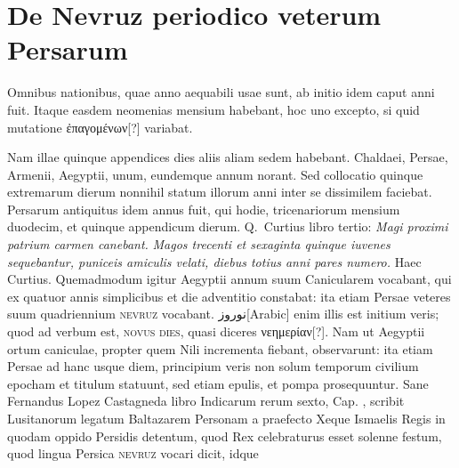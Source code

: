 \section{De Nevruz periodico veterum Persarum}
%
Omnibus nationibus, quae anno aequabili usae sunt, ab
initio idem caput anni fuit.
Itaque easdem neomenias mensium
habebant, hoc uno excepto, si quid mutatione \textgreek{ἐπαγομένων}[?]
variabat.
\begin{table}[htbp]
  
\end{table}
%
Nam illae quinque appendices dies aliis aliam sedem habebant.
Chaldaei, Persae, Armenii, Aegyptii, unum, eundemque annum
norant.
Sed collocatio quinque extremarum dierum nonnihil
statum illorum anni inter se dissimilem faciebat.
Persarum antiquitus
idem annus fuit, qui hodie, tricenariorum mensium duodecim, et
quinque appendicum dierum.
Q.~Curtius libro tertio: \textit{Magi proximi
patrium carmen canebant.}
\textit{Magos trecenti et sexaginta quinque
iuvenes sequebantur, puniceis amiculis velati, diebus totius anni pares
numero.}
Haec Curtius.
Quemadmodum igitur Aegyptii annum
suum Canicularem vocabant, qui ex quatuor annis simplicibus et
die adventitio constabat: ita etiam Persae veteres suum quadriennium
\textsc{nevruz} vocabant.
\textarabic{نوروز‎}[Arabic] enim illis est initium veris; quod ad
verbum est, \textsc{novus dies}, quasi diceres \textgreek{νεημερίαν}[?].
Nam ut Aegyptii
ortum caniculae, propter quem Nili incrementa fiebant, observarunt:
ita etiam Persae ad hanc usque diem, principium veris
non solum temporum civilium epocham et titulum statuunt, sed
etiam epulis, et pompa prosequuntur.
Sane Fernandus Lopez Castagneda
libro Indicarum rerum sexto, Cap. %
 , scribit Lusitanorum
legatum Baltazarem Personam a praefecto Xeque Ismaelis
Regis in quodam oppido Persidis detentum, quod Rex celebraturus
esset solenne festum, quod lingua Persica \textsc{nevruz} vocari dicit, idque
